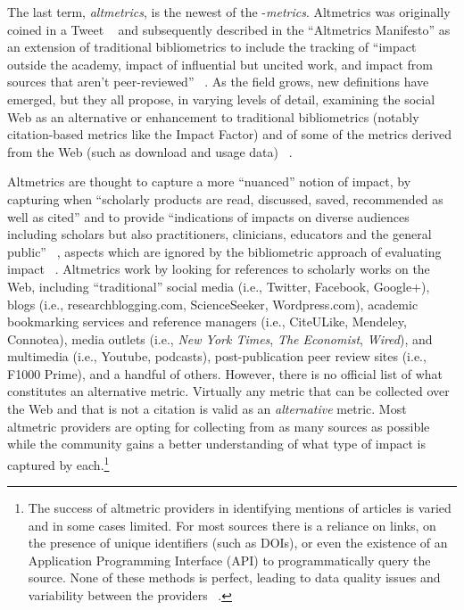 The last term, \emph{altmetrics}, is the newest of the -\emph{metrics}. Altmetrics was originally coined in a Tweet ~\citep{Priem2010b} and subsequently described in the ``Altmetrics Manifesto'' as an extension of traditional bibliometrics to include the tracking of ``impact outside the academy, impact of influential but uncited work, and impact from sources that aren't peer-reviewed'' ~\citep[n.p]{Priem2010c}. As the field grows, new definitions have emerged, but they all propose, in varying levels of detail, examining the social Web as an alternative or enhancement to traditional bibliometrics (notably citation-based metrics like the Impact Factor) and of some of the metrics derived from the Web (such as download and usage data) ~\citep{Galligan2013a}.

Altmetrics are thought to capture a more ``nuanced'' notion of impact, by capturing when ``scholarly products are read, discussed, saved, recommended as well as cited'' and to provide ``indications of impacts on diverse audiences including scholars but also practitioners, clinicians, educators and the general public'' ~\citep[p. 9]{Piwowar2013}, aspects which are ignored by the bibliometric approach of evaluating impact ~\citep{Sud2011,Piwowar2013d,Costas2014}. Altmetrics work by looking for references to scholarly works on the Web, including ``traditional'' social media (i.e., Twitter, Facebook, Google+), blogs (i.e., researchblogging.com, ScienceSeeker, Wordpress.com), academic bookmarking services and reference managers (i.e., CiteULike, Mendeley, Connotea), media outlets (i.e., \emph{New York Times}, \emph{The Economist}, \emph{Wired}), and multimedia (i.e., Youtube, podcasts), post-publication peer review sites (i.e., F1000 Prime), and a handful of others. However, there is no official list of what constitutes an alternative metric. Virtually any metric that can be collected over the Web and that is not a citation is valid as an \emph{alternative} metric. Most altmetric providers are opting for collecting from as many sources as possible while the community gains a better understanding of what type of impact is captured by each.\footnote{The success of altmetric providers in identifying mentions of articles is varied and in some cases limited. For most sources there is a reliance on links, on the presence of unique identifiers (such as DOIs), or even the existence of an Application Programming Interface (API) to programmatically query the source. None of these methods is perfect, leading to data quality issues and variability between the providers ~\citep{Zahedi2014a}.}

